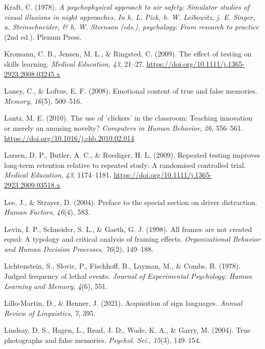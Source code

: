 \documentclass[
]{krantz}
\newlength{\cslhangindent}
\newenvironment{CSLReferences}[2] %
 {\begin{list}{}{%
  \setlength{\itemindent}{0pt}
  \setlength{\leftmargin}{0pt}
  \setlength{\parsep}{0pt}
  \ifodd #1
   \setlength{\leftmargin}{\cslhangindent}
   \setlength{\itemindent}{-1\cslhangindent}
  \fi
  \setlength{\itemsep}{#2\baselineskip}}}
 {\end{list}}
\begin{document}
\begin{CSLReferences}{1}{0}
Kraft, C. (1978). \emph{A psychophysical approach to air safety: Simulator studies of visual illusions in night approaches. In h. L. Pick, h. W. Leibowitz, j. E. Singer, a. Steinschneider, \& h. W. Steenson (eds.), psychology: From research to practice} (2nd ed.). Plenum Press.

Kromann, C. B., Jensen, M. L., \& Ringsted, C. (2009). The effect of testing on skills learning. \emph{Medical Education}, \emph{43}, 21--27. \url{https://doi.org/10.1111/j.1365-2923.2008.03245.x}

Laney, C., \& Loftus, E. F. (2008). Emotional content of true and false memories. \emph{Memory}, \emph{16}(5), 500--516.

Lantz, M. E. (2010). The use of 'clickers' in the classroom: Teaching innovation or merely an amusing novelty? \emph{Computers in Human Behavior}, \emph{26}, 556--561. \url{https://doi.org/10.1016/j.chb.2010.02.014}

Larsen, D. P., Butler, A. C., \& Roediger, H. L. (2009). Repeated testing improves long-term retention relative to repeated study: A randomised controlled trial. \emph{Medical Education}, \emph{43}, 1174--1181. \url{https://doi.org/10.1111/j.1365-2923.2009.03518.x}

Lee, J., \& Strayer, D. (2004). Preface to the special section on driver distraction. \emph{Human Factors}, \emph{46}(4), 583.

Levin, I. P., Schneider, S. L., \& Gaeth, G. J. (1998). All frames are not created equal: A typology and critical analysis of framing effects. \emph{Organizational Behavior and Human Decision Processes}, \emph{76}(2), 149--188.

Lichtenstein, S., Slovic, P., Fischhoff, B., Layman, M., \& Combs, B. (1978). Judged frequency of lethal events. \emph{Journal of Experimental Psychology: Human Learning and Memory}, \emph{4}(6), 551.

Lillo-Martin, D., \& Henner, J. (2021). Acquisition of sign languages. \emph{Annual Review of Linguistics}, \emph{7}, 395.

Lindsay, D. S., Hagen, L., Read, J. D., Wade, K. A., \& Garry, M. (2004). True photographs and false memories. \emph{Psychol. Sci.}, \emph{15}(3), 149--154.


\end{CSLReferences}
\end{document}
